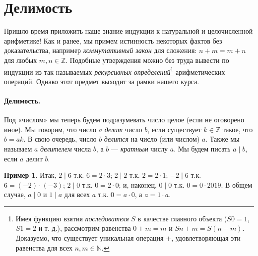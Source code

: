 \documentclass[12pt,notitlepage]{article}
\theoremstyle{plain}
\theoremstyle{definition}
\newtheorem{exm}[thm]{Пример}
\theoremstyle{plain}
\newcommand{\N}{\mathbb{N}}
\newcommand{\Z}{\mathbb{Z}}
\newcommand{\1}{\mathbf{1}}
\newcommand{\0}{\mathbf{0}}
\newcommand{\dvd}{\mathop{\mid}}
\newcommand{\mcomm}[1]{}
\begin{document}
\section{Делимость}
\mcomm{This section opens a series of classical results on integer arithmetic. We looked upon them as a playground for the students to try induction principles in solving concrete problems and, of course, to have some rest before coming back to more abstract concepts.}

Пришло время приложить наше знание индукции к натуральной и целочисленной арифметике! Как и ранее, мы примем истинность некоторых фактов без доказательства, например \emph{коммутативный закон} для сложения: $n + m = m + n$ для любых $m, n \in \Z$. Подобные утверждения можно без труда вывести по индукции из так называемых \emph{рекурсивных определений}\footnote{Имея функцию взятия \emph{последователя}  $S$ в качестве главного объекта ($S 0 = 1$, $S 1 = 2$ и т. д.), рассмотрим равенства $0 + m = m$ и $S n + m = S(n + m)$. Доказуемо, что существует уникальная операция ${+}$, удовлетворяющая эти равенства для всех $n, m  \in \N$.} арифметических операций. Однако этот предмет выходит за рамки нашего курса.

\paragraph{Делимость.} Под «числом» мы теперь будем подразумевать число целое (если не оговорено иное). Мы говорим, что число $a$ \emph{делит} число $b$, если существует $k \in \Z$ такое, что $b = ak$. В свою очередь, число $b$ \emph{делится} на число (или числом) $a$. Также мы называем $a$ \emph{делителем} числа $b$, а $b$ --- \emph{кратным} числу $a$. Мы будем писать $a \dvd b$, если $a$ делит $b$.

\mcomm{Most students feel quite uncomfortable with the fact that $0$ divides $0$. They tend to ignore the \emph{definition} in favor of \emph{connotations}: ``as it is not possible to \emph{divide by} zero, zero cannot \emph{divide} anything''. Of course, it is a general problem of mathematical education that the students just do not \emph{read} what is written.  The Instructor should use such examples to demonstrate the importance of clear and, perhaps, \emph{slow} reading in mathematics (likewise the latter is important in philology, according to Nietzsche's famous maxim).}
\begin{exm}
	Итак, $2 \dvd 6$ т.к. $6 = 2 \cdot 3$; $2 \dvd 2$ т.к. $2 = 2 \cdot 1$; $-2 \dvd 6$ т.к. $6 = (-2) \cdot (-3)$; $2 \dvd 0$ т.к. $0 = 2 \cdot 0$; и, наконец, $0 \dvd 0$ т.к. $0 = 0 \cdot 2019$. В общем случае, $a \dvd 0$  и $1 \dvd a$ для всех $a$ т.к. $0 = a \cdot 0$, а $a = 1 \cdot a$.
\end{exm}
\end{document}
